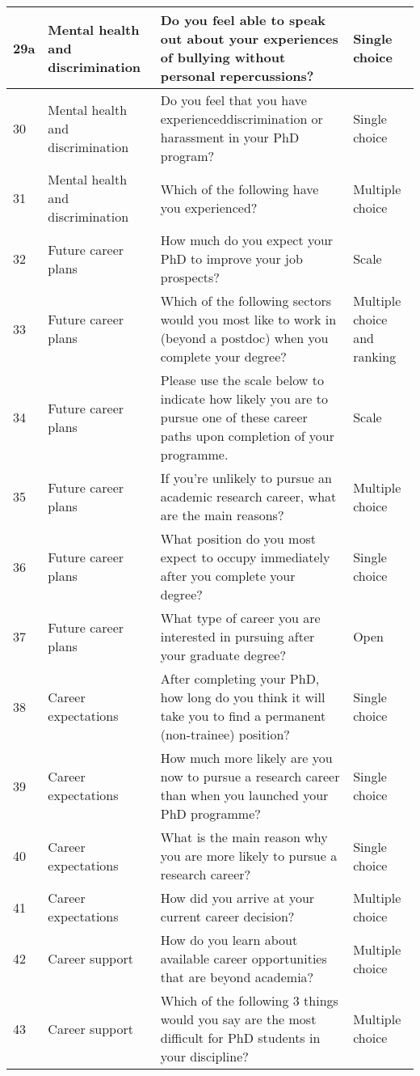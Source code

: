 \documentclass[
]{article}
\begin{document}
\begin{table}[H]
\begin{tabular}{l|l|l|l}
\hline
29a & Mental health and discrimination & Do you feel able to speak out about your experiences of bullying without personal repercussions? & Single choice\\
\hline
30 & Mental health and discrimination & Do you feel that you have experienceddiscrimination or harassment in your PhD program? & Single choice\\
\hline
31 & Mental health and discrimination & Which of the following have you experienced? & Multiple choice\\
\hline
32 & Future career plans & How much do you expect your PhD to improve your job prospects? & Scale\\
\hline
33 & Future career plans & Which of the following sectors would you most like to work in (beyond a postdoc) when you complete your degree? & Multiple choice and ranking\\
\hline
34 & Future career plans & Please use the scale below to indicate how likely you are to pursue one of these career paths upon completion of your programme. & Scale\\
\hline
35 & Future career plans & If you’re unlikely to pursue an academic research career, what are the main reasons? & Multiple choice\\
\hline
36 & Future career plans & What position do you most expect to occupy immediately after you complete your degree? & Single choice\\
\hline
37 & Future career plans & What type of career you are interested in pursuing after your graduate degree? & Open\\
\hline
38 & Career expectations & After completing your PhD, how long do you think it will take you to find a permanent (non-trainee) position? & Single choice\\
\hline
39 & Career expectations & How much more likely are you now to pursue a research career than when you launched your PhD programme? & Single choice\\
\hline
40 & Career expectations & What is the main reason why you are more likely to pursue a research career? & Single choice\\
\hline
41 & Career expectations & How did you arrive at your current career decision? & Multiple choice\\
\hline
42 & Career support & How do you learn about available career opportunities that are beyond academia? & Multiple choice\\
\hline
43 & Career support & Which of the following 3 things would you say are the most difficult for PhD students in your discipline? & Multiple choice\\

\end{tabular}
\end{table}
\end{document}
